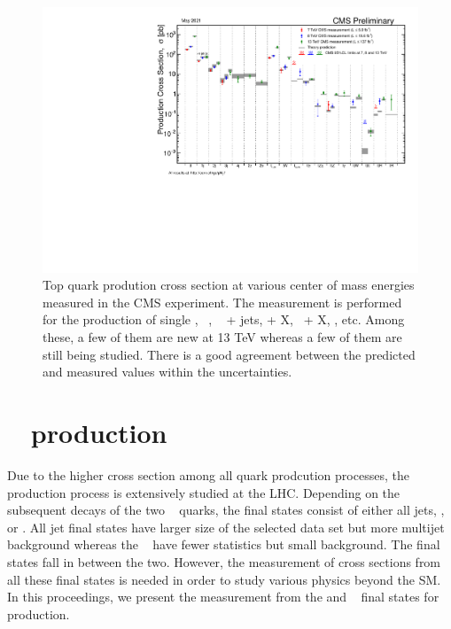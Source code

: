 \begin{figure}[htb!]
\centering
\includegraphics[width=1.0\linewidth]{SigmaNew_v8.pdf}
\caption{Top quark prodution cross section at various center of mass energies measured in the
	CMS experiment. The measurement is performed for the production of single \PQt, \ttbar~, \ttbar~ + jets, \PQt + X, \ttbar~+ X, \ttbar\ttbar, etc. Among these, a few of them are new at 13 TeV whereas a
	few of them are still being studied. There is a good agreement between the predicted and
	measured values within the uncertainties.}
\label{fig:xss}
\end{figure}

\section{\ttbar~ production \xss}
\label{sec:tt}
Due to the higher cross section among all \PQt quark prodcution processes, the \ttbar~ production process is extensively studied at the LHC.
Depending on the subsequent decays of the two \PQt~ quarks, the final states consist of either all
jets, \ljets, or \dilep. All jet final states have larger size of the selected data set but more 
multijet background whereas the \dilep~ have fewer statistics but small background. The \ljets 
final states fall in between the two. However, the measurement of cross sections from all these 
final states is needed in order to study various physics beyond the SM. In this proceedings, we 
present the measurement from the \ljets and \dilep~ final states for \ttbar~ production.


